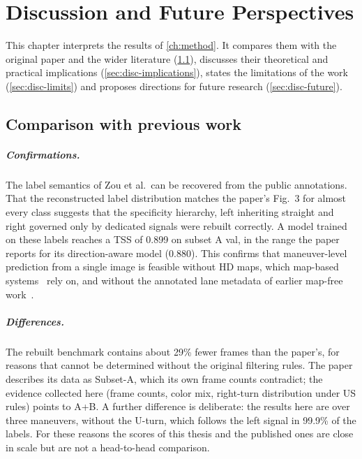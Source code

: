 \chapter{Discussion and Future Perspectives}
\label{ch:discussion}

This chapter interprets the results of \cref{ch:method}. It compares them with the original paper and
the wider literature (\cref{sec:disc-compare}), discusses their theoretical and practical implications
(\cref{sec:disc-implications}), states the limitations of the work (\cref{sec:disc-limits}) and proposes
directions for future research (\cref{sec:disc-future}).

\section{Comparison with previous work}
\label{sec:disc-compare}

\paragraph{Confirmations.} The label semantics of Zou et al.\ can be recovered from the public
annotations. That the reconstructed label distribution matches the paper's Fig.~3 for almost every
class suggests that the specificity hierarchy, left inheriting straight and right governed only by
dedicated signals were rebuilt correctly. A model trained on these labels reaches a TSS of 0.899 on
subset A val, in the range the paper reports for its direction-aware model (0.880). This confirms that
maneuver-level prediction from a single image is feasible without HD maps, which map-based
systems~\cite{fairfield2011traffic,possatti2019traffic,polley2025atlas} rely on, and without the
annotated lane metadata of earlier map-free work~\cite{langenberg2019deep}.

\paragraph{Differences.} The rebuilt benchmark contains about 29\% fewer frames than the paper's, for
reasons that cannot be determined without the original filtering rules. The paper describes its data as
Subset-A, which its own frame counts contradict; the evidence collected here (frame counts, color mix,
right-turn distribution under US rules) points to A+B. A further difference is deliberate: the results
here are over three maneuvers, without the U-turn, which follows the left signal in 99.9\% of the labels.
For these reasons the scores of this thesis and the published ones are close in scale but are not a
head-to-head comparison.

